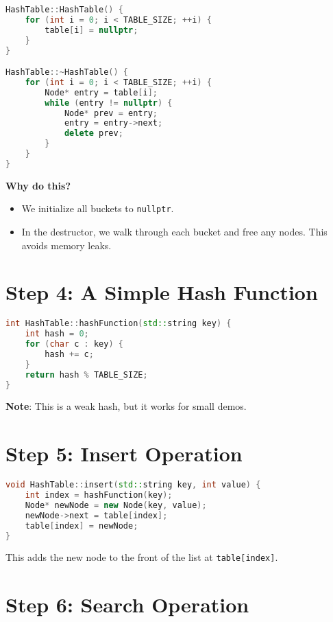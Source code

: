 \documentclass{article}
\begin{document}
\begin{lstlisting}[language=C++]
HashTable::HashTable() {
    for (int i = 0; i < TABLE_SIZE; ++i) {
        table[i] = nullptr;
    }
}

HashTable::~HashTable() {
    for (int i = 0; i < TABLE_SIZE; ++i) {
        Node* entry = table[i];
        while (entry != nullptr) {
            Node* prev = entry;
            entry = entry->next;
            delete prev;
        }
    }
}
\end{lstlisting}

\textbf{Why do this?}

\begin{itemize}
    \item We initialize all buckets to \texttt{nullptr}.
    \item In the destructor, we walk through each bucket and free any nodes. This avoids memory leaks.
\end{itemize}

\section*{Step 4: A Simple Hash Function}

\begin{lstlisting}[language=C++, caption={Hash Function for Strings}]
int HashTable::hashFunction(std::string key) {
    int hash = 0;
    for (char c : key) {
        hash += c;
    }
    return hash % TABLE_SIZE;
}
\end{lstlisting}

\textbf{Note}: This is a weak hash, but it works for small demos.

\section*{Step 5: Insert Operation}

\begin{lstlisting}[language=C++]
void HashTable::insert(std::string key, int value) {
    int index = hashFunction(key);
    Node* newNode = new Node(key, value);
    newNode->next = table[index];
    table[index] = newNode;
}
\end{lstlisting}

This adds the new node to the front of the list at \texttt{table[index]}.

\section*{Step 6: Search Operation}
\end{document}
